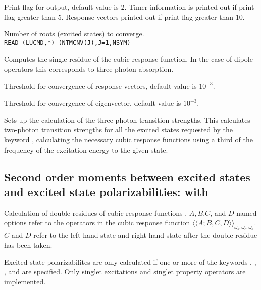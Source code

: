 \begin{description}
\item{}
Print flag for output, default value is 2. Timer information is printed
out if print flag greater than 5. Response vectors printed out if
print flag greater than 10.

\item{}
Number of roots (excited states) to converge. \\
\verb|READ (LUCMD,*) (NTMCNV(J),J=1,NSYM)|\\

\item{}
Computes the single residue of the cubic
response function.
In the case of dipole operators this corresponds to
three-photon absorption.

\item{}
Threshold for convergence of response vectors, default value is $10^{-3}$.

\item{}
Threshold for convergence of eigenvector, default value is $10^{-3}$.

\item{}
Sets up the calculation of the three-photon transition strengths. This
calculates two-photon transition strengths for all the excited states
requested by the keyword , calculating the necessary
cubic response functions using  a third of the frequency of the
excitation energy to the given state.

\end{description}


\subsection{Second order moments between excited states and excited state polarizabilities:
 with }
Calculation of double residues of
cubic response functions
\cite{pndjovhacpl242,djpnhajcp105,pndjhapdkrthhkcpl253}.
$A,B$,$C$, and $D$-named options refer to the operators in the cubic
response function 
$\langle\!\langle A;B,C,D \rangle\!\rangle_{\omega_b,\omega_c,\omega_d}$.
$C$ and $D$ refer to the left hand state and right hand state
after the double residue has been taken.

Excited state polarizabilites are only calculated if one or more of the keywords
, , , and 
are specified.
Only singlet excitations and singlet property operators are implemented.

